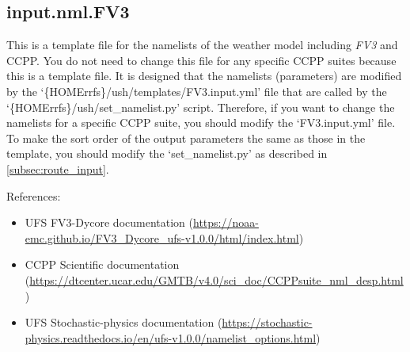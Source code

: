\documentclass[11pt,fleqn]{report}              %
\begin{document}
\subsection{input.nml.FV3}
\label{subsec:fv3_input_nml}

This is a template file for the namelists of the weather model including {\it FV3} and CCPP. You do not need to change this file for any specific CCPP suites because this is a template file. It is designed that the namelists (parameters) are modified by the `\{HOMErrfs\}/ush/templates/FV3.input.yml' file that are called by the `\{HOMErrfs\}/ush/set\_namelist.py' script. Therefore, if you want to change the namelists for a specific CCPP suite, you should modify the `FV3.input.yml' file. To make the sort order of the output parameters the same as those in the template, you should modify the `set\_namelist.py' as described in \ref{subsec:route_input}.

\vspace{0.5cm}

References: 
\begin{itemize}
\item UFS FV3-Dycore documentation (\url{https://noaa-emc.github.io/FV3_Dycore_ufs-v1.0.0/html/index.html})
\item CCPP Scientific documentation (\url{https://dtcenter.ucar.edu/GMTB/v4.0/sci_doc/CCPPsuite_nml_desp.html})
\item UFS Stochastic-physics documentation (\url{https://stochastic-physics.readthedocs.io/en/ufs-v1.0.0/namelist_options.html})
\end{itemize}

\vspace{0.2cm}
\end{document}
